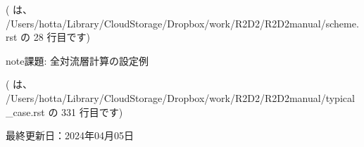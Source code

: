 \documentclass[letterpaper,10pt,dvipdfmx,report]{sphinxmanual}
\begin{document}
\sphinxAtStartPar
({\hyperref[\detokenize{scheme:id6}]{}} は、 /Users/hotta/Library/CloudStorage/Dropbox/work/R2D2/R2D2\sphinxhyphen{}manual/scheme.rst の 28 行目です)

\begin{sphinxadmonition}{note}{課題:}
\sphinxAtStartPar
全対流層計算の設定例
\end{sphinxadmonition}

\sphinxAtStartPar
({\hyperref[\detokenize{typical_case:id10}]{}} は、 /Users/hotta/Library/CloudStorage/Dropbox/work/R2D2/R2D2\sphinxhyphen{}manual/typical\_case.rst の 331 行目です)

\sphinxAtStartPar
最終更新日：2024年04月05日


\renewcommand{\indexname}{Pythonモジュール索引}
\begin{sphinxtheindex}
\let\bigletter\sphinxstyleindexlettergroup
\bigletter{r}
\item\relax{}
\end{sphinxtheindex}

\renewcommand{\indexname}{索引}
\printindex
\end{document}
